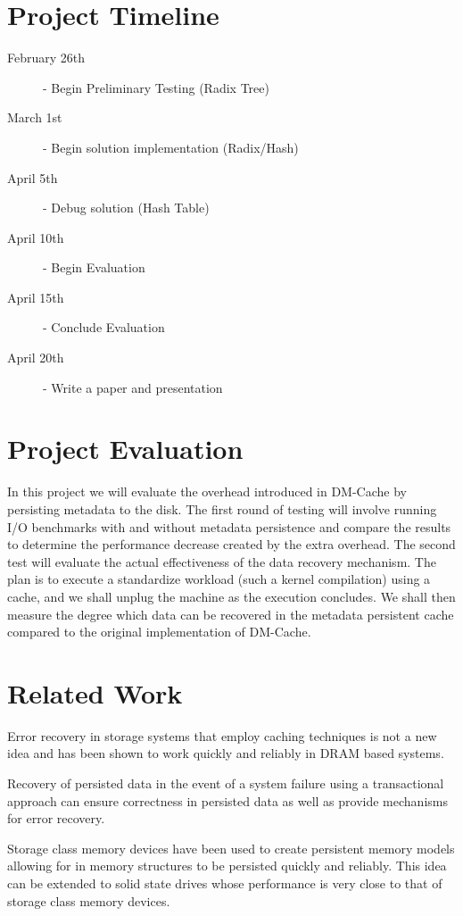\documentclass[letterpaper,12pt]{article}
\begin{document}

\section*{Project Timeline}

\begin{description}
  \item[February 26th] - Begin Preliminary Testing (Radix Tree)
  \item[March 1st] - Begin solution implementation (Radix/Hash)
  \item[April 5th] - Debug solution (Hash Table)
  \item[April 10th] - Begin Evaluation
  \item[April 15th] - Conclude Evaluation
  \item[April 20th] - Write a paper and presentation
\end{description}


\section*{Project Evaluation}

In this project we will evaluate the overhead introduced in DM-Cache
by persisting metadata to the disk. The first round of testing will
involve running I/O benchmarks with and without metadata persistence
and compare the results to determine the performance decrease created
by the extra overhead. The second test will evaluate the actual
effectiveness of the data recovery mechanism. The plan is to execute a
standardize workload (such a kernel compilation) using a cache, and we
shall unplug the machine as the execution concludes. We shall then
measure the degree which data can be recovered in the metadata
persistent cache compared to the original implementation of DM-Cache.


\section*{Related Work}

Error recovery in storage systems that employ caching techniques is
not a new idea and has been shown to work quickly and reliably in DRAM
based systems\cite{RAMCloud}.

Recovery of persisted data in the event of a system failure using a
transactional approach can ensure correctness in persisted data as
well as provide mechanisms for error recovery\cite{NVHeaps}.

Storage class memory devices have been used to create persistent
memory models allowing for in memory structures to be persisted
quickly and reliably\cite{Mnemosyne}. This idea can be extended to
solid state drives whose performance is very close to that of storage
class memory devices.




\end{document}
